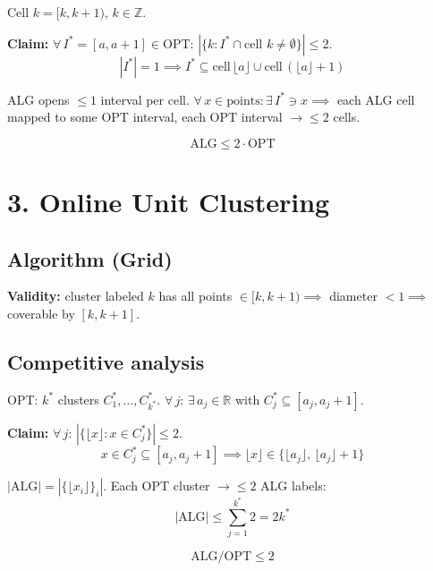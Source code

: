 \documentclass[11pt]{article}
\begin{document}
Cell $k = [k, k{+}1)$, $k \in \mathbb{Z}$.

\textbf{Claim:} $\forall\, I^* = [a, a{+}1] \in \mathrm{OPT}$: $|\{k : I^* \cap \text{cell } k \ne \emptyset\}| \le 2$.
\[
|I^*| = 1 \implies I^* \subseteq \text{cell}\, \lfloor a \rfloor \cup \text{cell}\, (\lfloor a \rfloor + 1)
\]

ALG opens $\le 1$ interval per cell. $\forall\, x \in \mathrm{points}: \exists\, I^* \ni x \implies $ each ALG cell mapped to some OPT interval, each OPT interval $\to \le 2$ cells.

\vspace{-8pt}
\[\boxed{\mathrm{ALG} \le 2 \cdot \mathrm{OPT}}\]


\section*{3. Online Unit Clustering}

\vspace{-10pt}
\subsection*{Algorithm (Grid)}

\begin{algorithm}[H]
\DontPrintSemicolon
{}
\end{algorithm}

\textbf{Validity:} cluster labeled $k$ has all points $\in [k, k{+}1) \implies$ diameter $< 1 \implies$ coverable by $[k, k{+}1]$.

\vspace{-10pt}
\subsection*{Competitive analysis}

OPT: $k^*$ clusters $C_1^*, \ldots, C_{k^*}^*$. $\forall\, j$: $\exists\, a_j \in \mathbb{R}$ with $C_j^* \subseteq [a_j, a_j{+}1]$.

\textbf{Claim:} $\forall\, j$: $|\{\lfloor x \rfloor : x \in C_j^*\}| \le 2$.
\[
x \in C_j^* \subseteq [a_j, a_j{+}1] \implies \lfloor x \rfloor \in \{\lfloor a_j \rfloor,\, \lfloor a_j \rfloor + 1\}
\]

$|\mathrm{ALG}| = |\{\lfloor x_i \rfloor\}_i|$. Each OPT cluster $\to \le 2$ ALG labels:
\[
|\mathrm{ALG}| \le \sum_{j=1}^{k^*} 2 = 2 k^*
\]

\vspace{-8pt}
\[\boxed{\mathrm{ALG}/\mathrm{OPT} \le 2}\]
\end{document}
